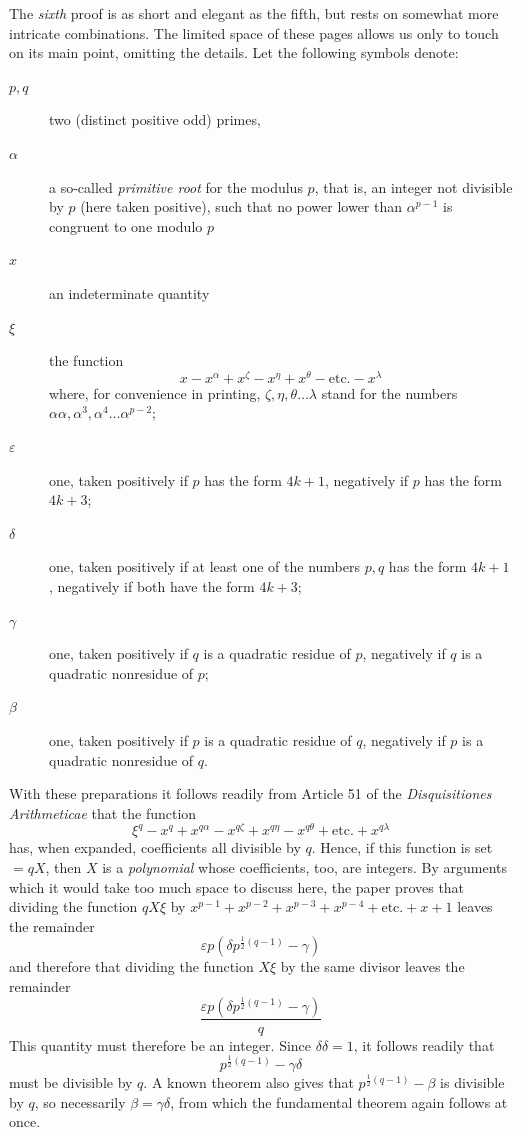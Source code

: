 The \emph{sixth} proof is as short and elegant as the fifth, but rests on somewhat more intricate combinations. The limited space of these pages allows us only to touch on its main point, omitting the details. Let the following symbols denote:
\begin{description}
\item[$p,q$] two (distinct positive odd) primes,
\item[$\alpha$] a so-called \emph{primitive root} for the modulus $p$, that is, an integer not divisible by $p$ (here taken positive), such that no power lower than $\alpha^{p-1}$ is congruent to one modulo $p$
\item[$x$] an indeterminate quantity
%
\item[$\xi$] the function
\[
x-x^\alpha+x^\zeta-x^\eta+x^\theta-\text{etc.}-x^\lambda
\]
where, for convenience in printing, $\zeta,\eta,\theta\ldots\lambda$ stand for the numbers $\alpha\alpha,\allowbreak \alpha^3,\allowbreak \alpha^4\ldots\allowbreak \alpha^{p-2}$;
\item[$\varepsilon$] one, taken positively if $p$ has the form $4k+1$, negatively if $p$ has the form $4k+3$;
\item[$\delta$] one, taken positively if at least one of the numbers $p,q$ has the form $4k+1$, negatively if both have the form $4k+3$;
\item[$\gamma$] one, taken positively if $q$ is a quadratic residue of $p$, negatively if $q$ is a quadratic nonresidue of $p$;
\item[$\beta$] one, taken positively if $p$ is a quadratic residue of $q$, negatively if $p$ is a quadratic nonresidue of $q$.
\end{description}

With these preparations it follows readily from Article 51 of the \emph{Disquisitiones Arithmeticae} that the function
\[
\xi^q-x^q+x^{q\alpha}-x^{q\zeta}+x^{q\eta}-x^{q\theta}+\text{etc.}+x^{q\lambda}
\]
has, when expanded, coefficients all divisible by $q$. Hence, if this function is set $=qX$, then $X$ is a \emph{polynomial} whose coefficients, too, are integers. By arguments which it would take too much space to discuss here, the paper proves that dividing the function $qX\xi$ by $x^{p-1}+x^{p-2}+x^{p-3}+x^{p-4}+\text{etc.}+x+1$ leaves the remainder
\[
\varepsilon p(\delta p^{\frac12(q-1)}-\gamma)
\]
and therefore that dividing the function $X\xi$ by the same divisor leaves the remainder
\[
\frac{\varepsilon p(\delta p^{\frac12(q-1)}-\gamma)}{q}
\]
This quantity must therefore be an integer. Since $\delta\delta=1$, it follows readily that
\[
p^{\frac12(q-1)}-\gamma\delta
\]
must be divisible by $q$. A known theorem also gives that $p^{\frac12(q-1)}-\beta$ is divisible by $q$, so necessarily $\beta=\gamma\delta$, from which the fundamental theorem again follows at once.

